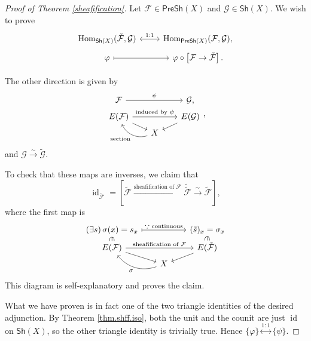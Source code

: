 \begin{proof}[Proof of Theorem \ref{sheafification}]
    Let $\mathcal{F}\in\mathsf{PreSh}(X)$ and $\mathcal{G}\in\mathsf{Sh}(X)$. We wish to prove
    \[ \begin{tikzcd}[row sep=3]
        \operatorname{Hom}_{\mathsf{Sh}(X)}(\tilde{\mathcal{F}},\mathcal{G}) \arrow[r, leftrightarrow, "1:1"] & \operatorname{Hom}_{\mathsf{PreSh}(X)}(\mathcal{F},\mathcal{G}), \\
        \varphi \arrow[r, mapsto] & \varphi\circ\left[\mathcal{F}\to\tilde{\mathcal{F}}\right].
    \end{tikzcd} \]

    The other direction is given by
    \[ \begin{tikzcd}[row sep=3, column sep=scriptsize]
        \mathcal{F} \arrow[rr, "\psi"] & & \mathcal{G}, \\
        E(\mathcal{F}) \arrow[rr, "\text{induced by }\psi"] \arrow[rd] && E(\mathcal{G}) \arrow[ld] \\
        & X \arrow[ul, bend left=42, "\text{section}", description]
    \end{tikzcd}, \]
    and $\mathcal{G}\xrightarrow{\sim}\tilde{\mathcal{G}}$.

    To check that these maps are inverses, we claim that
    $$\operatorname{id}_{\tilde{\mathcal{F}}}=\left[\tilde{\mathcal{F}}\xrightarrow{\text{sheafification of }\mathcal{F}}\tilde{\tilde{\mathcal{F}}}\xrightarrow{\sim}\tilde{\mathcal{F}}\right],$$
    where the first map is
    \[ \begin{tikzcd}[row sep=3, column sep=scriptsize]
        \left(\exists s\right)\sigma(x)=s_x \arrow[rr, mapsto, "\because\text{ continuous}"] \arrow[d, "\in", sloped, phantom, description] & & (\tilde{s})_x=\sigma_x \arrow[d, "\in", sloped, phantom, description] \\
        E(\mathcal{F}) \arrow[rr, "\text{sheafification of }\mathcal{F}"] \arrow[rd] & & E(\tilde{\mathcal{F}}) \arrow[ld] \\
        & X \arrow[ul, bend left=35, "\sigma"]
    \end{tikzcd} \]
    This diagram is self-explanatory and proves the claim. 

    What we have proven is in fact one of the two triangle identities of the desired adjunction. By Theorem \ref{thm.shff.iso}, both the unit and the counit are just $\operatorname{id}$ on $\mathsf{Sh}(X)$, so the other triangle identity is trivially true. Hence $\{\varphi\}\stackrel{1:1}{\longleftrightarrow}\{\psi\}$.    
\end{proof}

